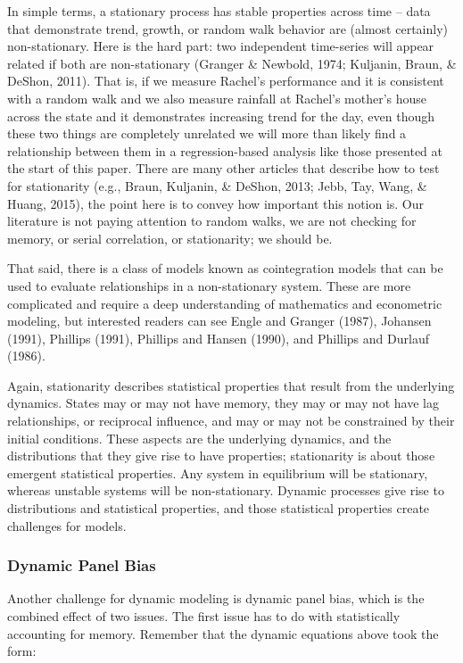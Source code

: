 \documentclass[english,,man]{apa6}
\theoremstyle{definition}
\theoremstyle{definition}
\theoremstyle{definition}
\theoremstyle{remark}
\begin{document}
In simple terms, a stationary process has stable properties across time
-- data that demonstrate trend, growth, or random walk behavior are
(almost certainly) non-stationary. Here is the hard part: two
independent time-series will appear related if both are non-stationary
(Granger \& Newbold, 1974; Kuljanin, Braun, \& DeShon, 2011). That is,
if we measure Rachel's performance and it is consistent with a random
walk and we also measure rainfall at Rachel's mother's house across the
state and it demonstrates increasing trend for the day, even though
these two things are completely unrelated we will more than likely find
a relationship between them in a regression-based analysis like those
presented at the start of this paper. There are many other articles that
describe how to test for stationarity (e.g., Braun, Kuljanin, \& DeShon,
2013; Jebb, Tay, Wang, \& Huang, 2015), the point here is to convey how
important this notion is. Our literature is not paying attention to
random walks, we are not checking for memory, or serial correlation, or
stationarity; we should be.

That said, there is a class of models known as cointegration models that
can be used to evaluate relationships in a non-stationary system. These
are more complicated and require a deep understanding of mathematics and
econometric modeling, but interested readers can see Engle and Granger
(1987), Johansen (1991), Phillips (1991), Phillips and Hansen (1990),
and Phillips and Durlauf (1986).

Again, stationarity describes statistical properties that result from
the underlying dynamics. States may or may not have memory, they may or
may not have lag relationships, or reciprocal influence, and may or may
not be constrained by their initial conditions. These aspects are the
underlying dynamics, and the distributions that they give rise to have
properties; stationarity is about those emergent statistical properties.
Any system in equilibrium will be stationary, whereas unstable systems
will be non-stationary. Dynamic processes give rise to distributions and
statistical properties, and those statistical properties create
challenges for models.

\hypertarget{dynamic-panel-bias}{%
\subsubsection{Dynamic Panel Bias}\label{dynamic-panel-bias}}

Another challenge for dynamic modeling is dynamic panel bias, which is
the combined effect of two issues. The first issue has to do with
statistically accounting for memory. Remember that the dynamic equations
above took the form:
\end{document}
